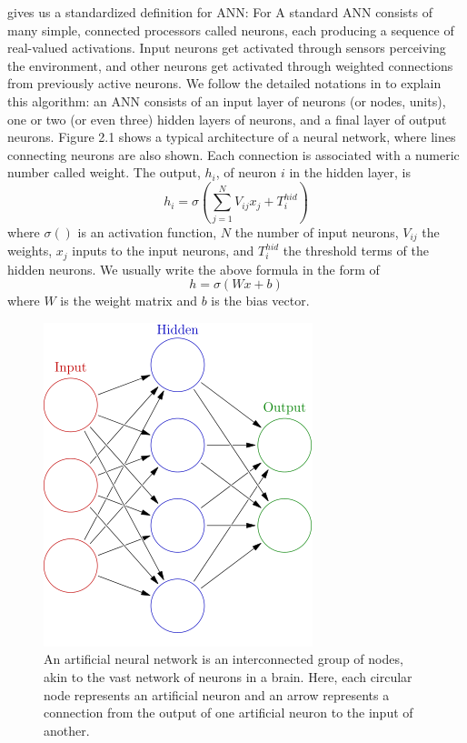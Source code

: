 \documentclass[12pt]{report} %
\begin{document}
\cite{NN} gives us a standardized definition for ANN: For A standard ANN consists of many simple, connected processors called neurons, each producing a sequence of real-valued activations. Input neurons get activated through sensors perceiving the environment, and other neurons get activated through weighted connections from previously active neurons. We follow the detailed notations in \cite{NN2} to explain this algorithm: an ANN consists of an input layer of neurons (or nodes, units), one or two (or even three) hidden layers of neurons, and a final layer of output neurons. Figure 2.1 shows a typical architecture of a neural network, where lines connecting neurons are also shown. Each connection is associated with a numeric number called weight. The output, $h_{i}$, of neuron $i$ in the hidden layer, is
\begin{equation}
h_{i}=\sigma(\sum _{j=1}^{N}V_{ij}x_{j}+T_{i}^{hid})
\end{equation}
where $\sigma()$ is an activation function, $N$ the number of input neurons,  $V_{ij}$ the weights, $x_{j}$ inputs to the input neurons, and $T_{i}^{hid}$ the threshold terms of the hidden neurons\cite{NN2}. We usually write the above formula in the form of
\begin{equation}
h=\sigma(Wx+b)
\end{equation}
where $W$ is the weight matrix and $b$ is the bias vector.
\begin{figure}[H]
	\centering
	\includegraphics[scale=0.4]{pictures/neural_network.png}
	\caption{An artificial neural network is an interconnected group of nodes, akin to the vast network of neurons in a brain. Here, each circular node represents an artificial neuron and an arrow represents a connection from the output of one artificial neuron to the input of another\cite{NNPIC}.}
	\label{fig:1}
\end{figure}
\end{document}
